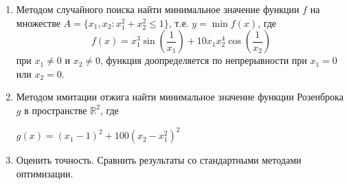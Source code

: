 
\begin{enumerate}
	\item Методом случайного поиска найти минимальное значение функции
     $f$ на множестве $A = \{x_1, x_2 : x_1^2 + x_2^2 \leq 1\}$, т.е.
     $y = \min f(x)$, где 
\begin{equation}
    f(x) = x_1^3 \sin \left( \frac{1}{x_1} \right) + 10 x_1 x_2^4 \cos 
     \left( \frac{1}{x_2} \right)
\end{equation}
     при $ x_1 \neq 0 $ и $ x_2 \neq 0 $, функция доопределяется по
     непрерывности при $ x_1 = 0 $ или $ x_2 = 0 $.
    \item Методом имитации отжига найти минимальное значение функции
     Розенброка $ g $ в пространстве $ \mathbb{R}^2 $, где 
\begin{center}
	$ g(x) = (x_1 - 1)^2 + 100 (x_2 - x_1^2)^2 $
\end{center}
    \item Оценить точность. Сравнить результаты со стандартными методами
     оптимизации.
\end{enumerate}

